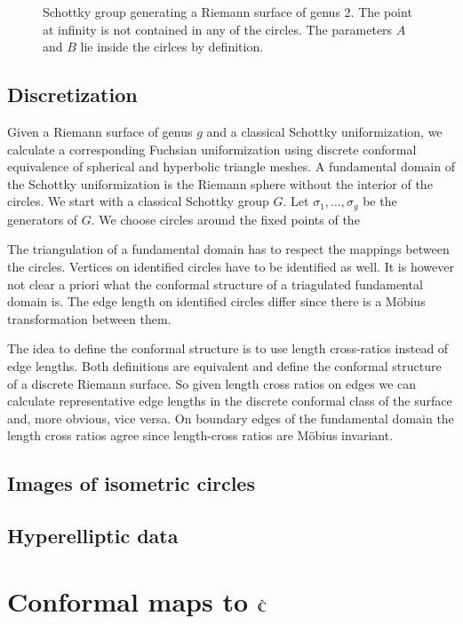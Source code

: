 \begin{figure}
	\centering
	\scalebox{1.0}{}
	\caption{Schottky group generating a Riemann surface of genus $2$. The point at infinity is not contained in 
any of the circles. The parameters $A$ and $B$ lie inside the cirlces by definition.}
	\label{fig:schottky_group}
\end{figure}



\subsection{Discretization}
Given a Riemann surface of genus $g$ and a classical Schottky uniformization, we calculate a corresponding 
Fuchsian uniformization using discrete conformal equivalence of spherical and hyperbolic triangle meshes.
A fundamental domain of the Schottky uniformization is the Riemann sphere without the interior of the circles.
We start with a classical Schottky group $G$. Let $\sigma_1,\ldots,\sigma_g$ be the generators of $G$. We choose circles around the fixed points of the

The triangulation of a fundamental domain has to respect the mappings between the circles. Vertices on identified 
circles have to be identified as well. It is however not clear a priori what the conformal structure of a triagulated 
fundamental domain is. The edge length on identified circles differ since there is a M{\" o}bius transformation 
between them. 

The idea to define the conformal structure is to use length cross-ratios instead of edge lengths. Both definitions are equivalent and define the conformal structure of a discrete Riemann surface. So given length cross ratios on edges we can calculate representative edge lengths in the discrete conformal class of the surface and, more obvious, vice versa. On boundary edges of the fundamental domain the length cross ratios agree since length-cross ratios are M{\" o}bius invariant.




\subsection{Images of isometric circles}
\subsection{Hyperelliptic data}

\section{Conformal maps to $\hat{\mathbb C}$}
